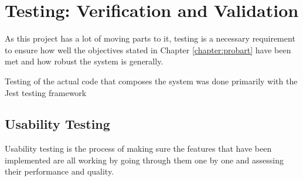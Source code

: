 \chapter{Testing: Verification and Validation}


As this project has a lot of moving parts to it, testing is a necessary requirement to ensure how well the objectives stated in Chapter \ref{chapter:probart} have been met and how robust the system is generally.

Testing of the actual code that composes the system was done primarily with the Jest testing framework \cite{jest}

\section{Usability Testing}

Usability testing is the process of making sure the features that have been implemented are all working by going through them one by one and assessing their performance and quality.

